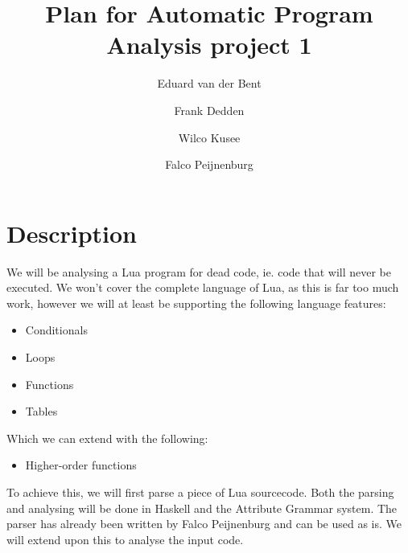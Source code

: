\documentclass[10pt]{article}
\title{Plan for Automatic Program Analysis project 1}
\author{Eduard van der Bent \and Frank Dedden \and Wilco Kusee \and Falco Peijnenburg}
\begin{document}
\maketitle

\section*{Description}
We will be analysing a Lua program for dead code, ie. code that will never be executed. We won't cover the complete language of Lua, as this is far too much work, however we will at least be supporting the following language features:
\begin{itemize}
	\item Conditionals
	\item Loops
	\item Functions
	\item Tables
\end{itemize}
Which we can extend with the following:
\begin{itemize}
	\item Higher-order functions
\end{itemize}
To achieve this, we will first parse a piece of Lua sourcecode. Both the parsing and analysing will be done in Haskell and the Attribute Grammar system. The parser has already been written by Falco Peijnenburg and can be used as is. We will extend upon this to analyse the input code.
\end{document}
